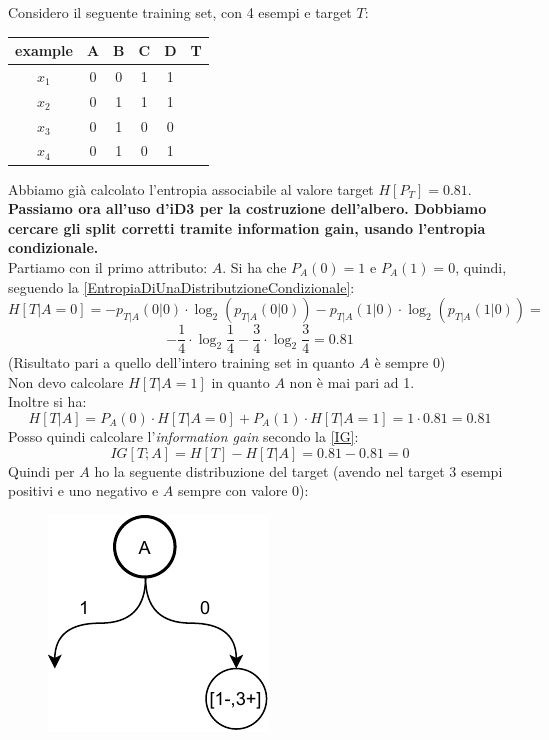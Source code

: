 \begin{esempio}
  Considero il seguente training set, con 4 esempi e target $T$:
  \begin{table}[H]
    \centering
    \begin{tabular}{c|c|c|c|c|c}
      example & A & B & C & D & T\\
      \hline
      $x_1$ & 0 & 0 & 1 & 1 & \color{darkgreen}{1}\\
      $x_2$ & 0 & 1 & 1 & 1 & \color{darkgreen}{1}\\
      $x_3$ & 0 & 1 & 0 & 0 & \color{red}{0}\\
      $x_4$ & 0 & 1 & 0 & 1 & \color{darkgreen}{1}\\
    \end{tabular}
  \end{table}
  Abbiamo già calcolato l'entropia associabile al valore target $H[P_T]=0.81$.\\
\textbf{  Passiamo ora all'uso d'iD3 per la costruzione dell'albero. Dobbiamo cercare gli split corretti tramite information gain, usando
  l'entropia condizionale.\\}
  Partiamo con il primo attributo: $A$. Si ha che $P_A(0)=1$ e $P_A(1)=0$,
  quindi, seguendo la \ref{EntropiaDiUnaDistributzioneCondizionale}:
  \[H[T|A=0]=-p_{T|A}(0|0)\cdot \log_2(p_{T|A}(0|0))-p_{T|A}(1|0)\cdot
    \log_2(p_{T|A}(1|0))=\]
  \[-\frac{1}{4}\cdot\log_2\frac{1}{4}-
    \frac{3}{4}\cdot\log_2\frac{3}{4}=0.81\]
  (Risultato pari a quello dell'intero training set in quanto $A$ è sempre 0)\\
  Non devo calcolare $H[T|A=1]$ in quanto $A$ non è mai pari ad 1.\\
  Inoltre si ha:
  \[H[T|A]=P_A(0)\cdot H[T|A=0]+P_A(1)\cdot H[T|A=1]=1\cdot 0.81=0.81\]
  Posso quindi calcolare l'\textit{information gain} secondo la \ref{IG}:
  \[IG[T;A]=H[T]-H[T|A]=0.81-0.81=0\]
  Quindi per $A$ ho la seguente distribuzione del target (avendo nel target 3
  esempi positivi e uno negativo e $A$ sempre con valore 0):
  \begin{figure}[H]
    \centering
    \includegraphics[scale = 0.9]{img/id1.pdf}

\end{figure}
\end{esempio}
